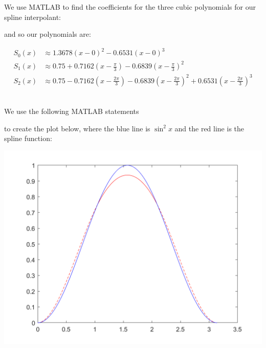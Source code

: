 \documentclass[11pt]{article}
\begin{document}
\section{} %
\subsection{} %
We use MATLAB to find the coefficients for the three cubic polynomials for our
spline interpolant:

and so our polynomials are:

\begin{align*}
	S_0(x)&\approx1.3678(x-0)^2-0.6531(x-0)^3\\
	S_1(x)&\approx0.75+0.7162\left(x-\frac{\pi}{3}\right)-0.6839\left(x-\frac{\pi}{3}\right)^2\\
	S_2(x)&\approx0.75-0.7162\left(x-\frac{2\pi}{3}\right)-0.6839\left(x-\frac{2\pi}{3}\right)^2+0.6531\left(x-\frac{2\pi}{3}\right)^3\\
\end{align*}


\subsection{} %
We use the following MATLAB statements 

to create the plot below, where the blue line is $\sin^2x$ and the red line is
the spline function:

\includegraphics[scale=0.45]{q3b.png}
\end{document}
